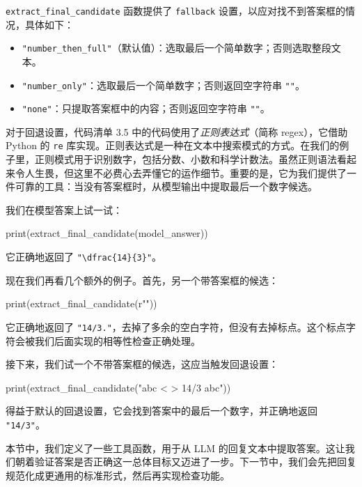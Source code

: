 \texttt{extract\_final\_candidate} 函数提供了 \texttt{fallback} 设置，以应对找不到答案框的情况，具体如下：

\begin{itemize}
\item \texttt{"}\texttt{number\_then\_full}\texttt{"}（默认值）：选取最后一个简单数字；否则选取整段文本。
\item \texttt{"}\texttt{number\_only}\texttt{"}：选取最后一个简单数字；否则返回空字符串 \texttt{""}。
\item \texttt{"}\texttt{none}\texttt{"}：只提取答案框中的内容；否则返回空字符串 \texttt{""}。
\end{itemize}

对于回退设置，代码清单 3.5 中的代码使用了\emph{正则表达式}（简称 regex），它借助 Python 的 \texttt{re} 库实现。正则表达式是一种在文本中搜索模式的方式。在我们的例子里，正则模式用于识别数字，包括分数、小数和科学计数法。虽然正则语法看起来令人生畏，但这里不必费心去弄懂它的运作细节。重要的是，它为我们提供了一件可靠的工具：当没有答案框时，从模型输出中提取最后一个数字候选。

我们在模型答案上试一试：

\begin{codebox}
print(extract_final_candidate(model_answer))
\end{codebox}

它正确地返回了 \texttt{"}\texttt{\textbackslash dfrac\{14\}\{3\}}\texttt{"}。

现在我们再看几个额外的例子。首先，另一个带答案框的候选：

\begin{codebox}
print(extract_final_candidate(r""))
\end{codebox}

它正确地返回了 \texttt{"}\texttt{14/3.}\texttt{"}，去掉了多余的空白字符，但没有去掉标点。这个标点字符会被我们后面实现的相等性检查正确处理。

接下来，我们试一个不带答案框的候选，这应当触发回退设置：

\begin{codebox}
print(extract_final_candidate("abc < > 14/3 abc"))
\end{codebox}

得益于默认的回退设置，它会找到答案中的最后一个数字，并正确地返回 \texttt{"}\texttt{14/3}\texttt{"}。

本节中，我们定义了一些工具函数，用于从 LLM 的回复文本中提取答案。这让我们朝着验证答案是否正确这一总体目标又迈进了一步。下一节中，我们会先把回复规范化成更通用的标准形式，然后再实现检查功能。

